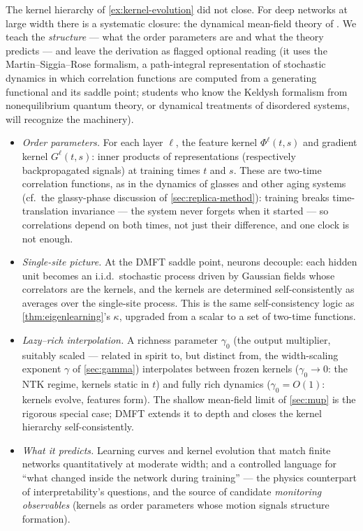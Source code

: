\documentclass[11pt]{article}
\begin{document}
The kernel hierarchy of \cref{ex:kernel-evolution} did not close. For deep
networks at large width there is a systematic closure: the dynamical
mean-field theory of \cite{bordelon2022self}. We teach the \emph{structure}
--- what the order parameters are and what the theory predicts --- and leave
the derivation as flagged optional reading (it uses the Martin--Siggia--Rose
formalism, a path-integral representation of stochastic dynamics in which
correlation functions are computed from a generating functional and its
saddle point; students who know the Keldysh formalism from nonequilibrium
quantum theory, or dynamical treatments of disordered systems, will
recognize the machinery).

\begin{itemize}
  \item \emph{Order parameters.} For each layer $\ell$, the feature kernel
  $\Phi^{\ell}(t, s)$ and gradient kernel $G^{\ell}(t, s)$: inner products
  of representations (respectively backpropagated signals) at training
  times $t$ and $s$. These are two-time correlation functions, as in the
  dynamics of glasses and other aging systems (cf.\ the glassy-phase
  discussion of \cref{sec:replica-method}): training breaks
  time-translation invariance --- the system never forgets when it started
  --- so correlations depend on both times, not just their difference, and
  one clock is not enough.
  \item \emph{Single-site picture.} At the DMFT saddle point, neurons
  decouple: each hidden unit becomes an i.i.d.\ stochastic process driven
  by Gaussian fields whose correlators are the kernels, and the kernels are
  determined self-consistently as averages over the single-site process.
  This is the same self-consistency logic as \cref{thm:eigenlearning}'s
  $\kappa$, upgraded from a scalar to a set of two-time functions.
  \item \emph{Lazy--rich interpolation.} A richness parameter $\gamma_0$
  (the output multiplier, suitably scaled --- related in spirit to, but
  distinct from, the width-scaling exponent $\gamma$ of \cref{sec:gamma})
  interpolates between frozen kernels ($\gamma_0 \to 0$: the NTK regime, kernels static in $t$) and
  fully rich dynamics ($\gamma_0 = O(1)$: kernels evolve, features form).
  The shallow mean-field limit of \cref{sec:mup} is the rigorous special
  case; DMFT extends it to depth and closes the kernel hierarchy
  self-consistently.
  \item \emph{What it predicts.} Learning curves and kernel evolution that
  match finite networks quantitatively at moderate width; and a controlled
  language for ``what changed inside the network during training'' --- the
  physics counterpart of interpretability's questions, and the source of
  candidate \emph{monitoring observables} (kernels as order parameters
  whose motion signals structure formation).
\end{itemize}
\end{document}

